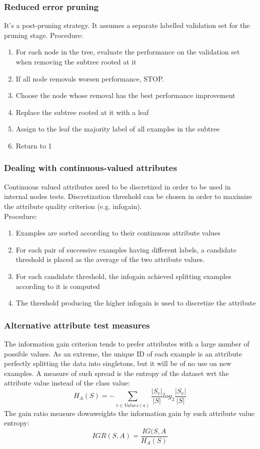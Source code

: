 \documentclass[a4paper, 10pt, titlepage]{article}
\begin{document}
\subsubsection{Reduced error pruning}
It's a post-pruning strategy. It assumes a separate labelled validation set for the pruning stage. Procedure:
\begin{enumerate}
\item For each node in the tree, evaluate the performance on the validation set when removing the subtree rooted at it
\item If all node removals worsen performance, STOP.
\item Choose the node whose removal has the best performance improvement
\item Replace the subtree rooted at it with a leaf
\item Assign to the leaf the majority label of all examples in the subtree
\item Return to 1
\end{enumerate}

\subsubsection{Dealing with continuous-valued attributes}
Continuous valued attributes need to be discretized in order to be used in internal nodes tests. Discretization threshold can be chosen in order to maximize the attribute quality criterion (e.g. infogain). \\
Procedure:
\begin{enumerate}
\item Examples are sorted according to their continuous attribute values
\item For each pair of successive examples having different labels, a candidate threshold is placed as the average of the two attribute values.
\item For each candidate threshold, the infogain achieved splitting examples according to it is computed
\item The threshold producing the higher infogain is used to discretize the attribute
\end{enumerate}

\subsubsection{Alternative attribute test measures}
The information gain criterion tends to prefer attributes with a large number of possible values. As an extreme, the unique ID of each example is an attribute perfectly splitting the data into singletons, but it will be of no use on new examples.
A measure of such spread is the entropy of the dataset wrt the attribute value instead of the class value:
$$H_A(S) = - \sum_{v \in Values(a)}{\dfrac{|S_v|}{|S|} log_2 \dfrac{|S_v|}{|S|}}$$
The gain ratio measure downweights the information gain by such attribute value entropy:
$$IGR(S,A) = \dfrac{IG(S,A}{H_A(S)}$$
\end{document}
